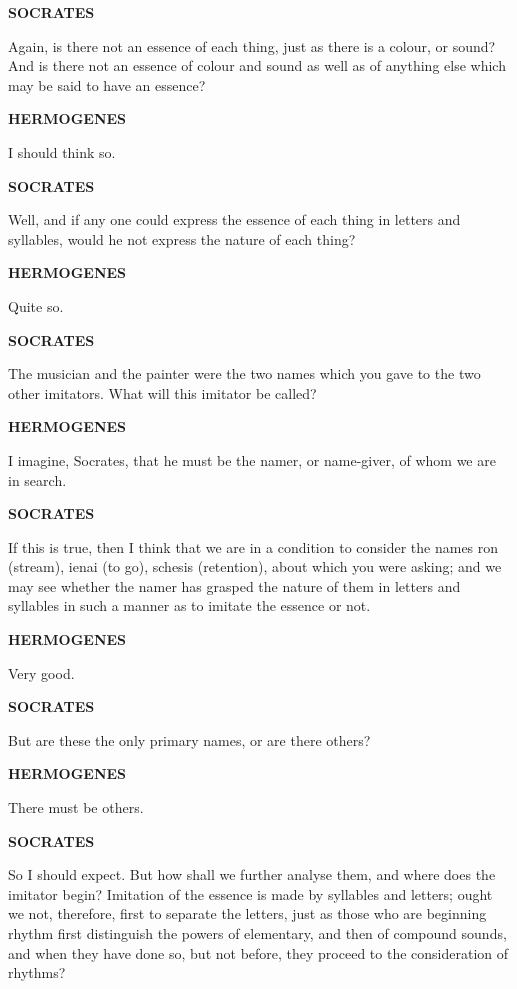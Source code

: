 \documentclass[11pt,letter]{article}
\begin{document}
\par \textbf{SOCRATES}
\par   Again, is there not an essence of each thing, just as there is a colour, or sound? And is there not an essence of colour and sound as well as of anything else which may be said to have an essence?

\par \textbf{HERMOGENES}
\par   I should think so.

\par \textbf{SOCRATES}
\par   Well, and if any one could express the essence of each thing in letters and syllables, would he not express the nature of each thing?

\par \textbf{HERMOGENES}
\par   Quite so.

\par \textbf{SOCRATES}
\par   The musician and the painter were the two names which you gave to the two other imitators. What will this imitator be called?

\par \textbf{HERMOGENES}
\par   I imagine, Socrates, that he must be the namer, or name-giver, of whom we are in search.

\par \textbf{SOCRATES}
\par   If this is true, then I think that we are in a condition to consider the names ron (stream), ienai (to go), schesis (retention), about which you were asking; and we may see whether the namer has grasped the nature of them in letters and syllables in such a manner as to imitate the essence or not.

\par \textbf{HERMOGENES}
\par   Very good.

\par \textbf{SOCRATES}
\par   But are these the only primary names, or are there others?

\par \textbf{HERMOGENES}
\par   There must be others.

\par \textbf{SOCRATES}
\par   So I should expect. But how shall we further analyse them, and where does the imitator begin? Imitation of the essence is made by syllables and letters; ought we not, therefore, first to separate the letters, just as those who are beginning rhythm first distinguish the powers of elementary, and then of compound sounds, and when they have done so, but not before, they proceed to the consideration of rhythms?
\end{document}

